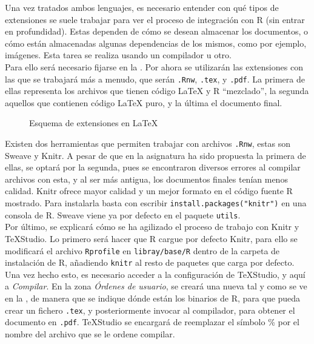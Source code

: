 \documentclass[12pt]{report}\usepackage[]{graphicx}\usepackage[dvipsnames]{xcolor}
\begin{document}
			Una vez tratados ambos lenguajes, es necesario entender con qué tipos de extensiones se suele trabajar para ver el proceso de integración con R (sin entrar en profundidad). Estas dependen de cómo se desean almacenar los documentos, o cómo están almacenadas algunas dependencias de los mismos, como por ejemplo, imágenes. Esta tarea se realiza usando un compilador u otro. \\
			
			Para ello será necesario fijarse en la . Por ahora se utilizarán las extensiones con las que se trabajará más a menudo, que serán \texttt{.Rnw}, \texttt{.tex}, y \texttt{.pdf}. La primera de ellas representa los archivos que tienen código \LaTeX{} y R ``mezclado'', la segunda aquellos que contienen código \LaTeX{} puro, y la última el documento final. \\
			
			\begin{figure}[H]
				\centering
				\caption{Esquema de extensiones en \LaTeX}
				\label{fig:extensiones}
			\end{figure}
			
			Existen dos herramientas que permiten trabajar con archivos \texttt{.Rnw}, estas son Sweave y Knitr. A pesar de que en la asignatura ha sido propuesta la primera de ellas, se optará por la segunda, pues se encontraron diversos errores al compilar archivos con esta, y al ser más antigua, los documentos finales tenían menos calidad. Knitr ofrece mayor calidad y un mejor formato en el código fuente R mostrado. Para instalarla basta con escribir \texttt{install.packages("knitr")} en una consola de R. Sweave viene ya por defecto en el paquete \texttt{utils}. \\
			
			Por último, se explicará cómo se ha agilizado el proceso de trabajo con Knitr y \TeX{}Studio. Lo primero será hacer que R cargue por defecto Knitr, para ello se modificará el archivo \texttt{Rprofile} en \texttt{libray/base/R} dentro de la carpeta de instalación de R, añadiendo \texttt{knitr} al resto de paquetes que carga por defecto. Una vez hecho esto, es necesario acceder a la configuración de \TeX{}Studio, y aquí a \textit{Compilar}. En la zona \textit{Órdenes de usuario}, se creará una nueva tal y como se ve en la , de manera que se indique dónde están los binarios de R, para que pueda crear un fichero \texttt{.tex}, y posteriormente invocar al compilador, para obtener el documento en \texttt{.pdf}. \TeX{}Studio se encargará de reemplazar el símbolo \% por el nombre del archivo que se le ordene compilar.
			
\end{document}
